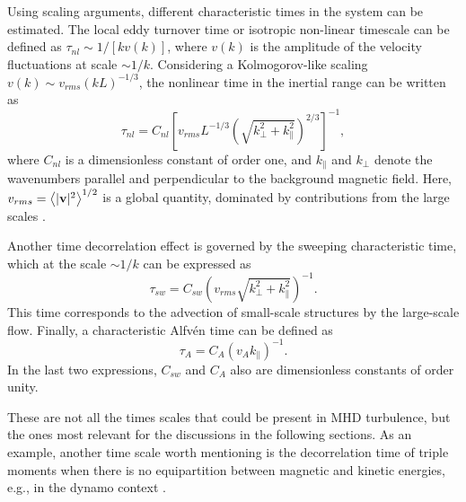\documentclass[aip,pop,reprint,amsmath,amssymb,floatfix]{revtex4-1}
\begin{document}
Using scaling arguments, different characteristic times in the system
can be estimated. The local eddy turnover time or isotropic non-linear
timescale can be defined as $\tau_{nl} \sim 1/\left[ k v(k) \right]$,
where $v(k)$ is the amplitude of the velocity fluctuations at scale
$\sim 1/k$. Considering a Kolmogorov-like scaling
$v(k) \sim v_{rms} \left(kL\right)^{-1/3}$, the nonlinear time in the
inertial range can be written as
\begin{equation}
\tau_{nl} = C_{nl} \left [
   v_{rms} L^{-1/3} \left(\sqrt{k^2_\perp +
   k^2_\parallel}\right)^{2/3}\right ]^{-1},
\label{eq:taunl}
\end{equation}
where $C_{nl}$ is a dimensionless constant of order one, and
$k_\parallel$ and $k_\perp$ denote the wavenumbers parallel and
perpendicular to the background magnetic field. Here,
$v_{rms} = \left\langle |{\bf v}|^2 \right\rangle ^{1/2}$ is a global
quantity, dominated by contributions from the large scales
\cite{zhou_magnetohydrodynamic_2004, matthaeus_anisotropic_2009}.

Another time decorrelation effect is governed by the sweeping
characteristic time, which at the scale $\sim 1/k$ can be expressed as
\begin{equation}
\tau_{sw} = C_{sw} \left( v_{rms}\sqrt{k^2_\perp + k^2_\parallel}
    \right)^{-1} .
\label{eq:tausw}
\end{equation}
This time corresponds to the advection of small-scale structures by
the large-scale flow. Finally, a characteristic Alfv\'en time can be
defined as
\begin{equation}
\tau_A= C_A \left( v_A k_\parallel \right)^{-1} .
\label{eq:taua}
\end{equation}
In the last two expressions, $C_{sw}$ and $C_A$ also are dimensionless
constants of order unity.

These are not all the times scales that could be present in MHD turbulence, 
but the ones most relevant for the discussions in the following sections. 
As an example, another time scale worth mentioning is the decorrelation 
time of triple moments when there is no equipartition between magnetic 
and kinetic energies, e.g., in the dynamo context 
\cite{baerenzung_2008_spectral}.
\end{document}
